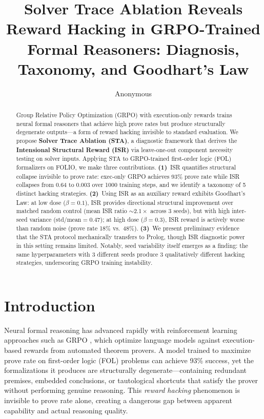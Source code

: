 \documentclass[11pt,a4paper]{article}
\title{Solver Trace Ablation Reveals Reward Hacking in GRPO-Trained\\Formal Reasoners: Diagnosis, Taxonomy, and Goodhart's Law}
\author{Anonymous}
\begin{document}
\maketitle

\begin{abstract}
Group Relative Policy Optimization (GRPO) with execution-only rewards trains neural formal reasoners that achieve high prove rates but produce structurally degenerate outputs---a form of reward hacking invisible to standard evaluation.
We propose \textbf{Solver Trace Ablation (STA)}, a diagnostic framework that derives the \textbf{Intensional Structural Reward (ISR)} via leave-one-out component necessity testing on solver inputs.
Applying STA to GRPO-trained first-order logic (FOL) formalizers on FOLIO, we make three contributions.
\textbf{(1)}~ISR quantifies structural collapse invisible to prove rate: exec-only GRPO achieves 93\% prove rate while ISR collapses from 0.64 to 0.003 over 1000 training steps, and we identify a taxonomy of 5 distinct hacking strategies.
\textbf{(2)}~Using ISR as an auxiliary reward exhibits Goodhart's Law: at low dose ($\beta{=}0.1$), ISR provides directional structural improvement over matched random control (mean ISR ratio ${\sim}2.1\times$ across 3 seeds), but with high inter-seed variance (std/mean$=$0.47); at high dose ($\beta{=}0.3$), ISR reward is actively worse than random noise (prove rate 18\% vs.\ 48\%).
\textbf{(3)}~We present preliminary evidence that the STA protocol mechanically transfers to Prolog, though ISR diagnostic power in this setting remains limited.
Notably, seed variability itself emerges as a finding: the same hyperparameters with 3 different seeds produce 3 qualitatively different hacking strategies, underscoring GRPO training instability.
\end{abstract}

\section{Introduction}

Neural formal reasoning has advanced rapidly with reinforcement learning approaches such as GRPO \cite{shao2024deepseekmath}, which optimize language models against execution-based rewards from automated theorem provers.
A model trained to maximize prove rate on first-order logic (FOL) problems can achieve 93\% success, yet the formalizations it produces are structurally degenerate---containing redundant premises, embedded conclusions, or tautological shortcuts that satisfy the prover without performing genuine reasoning.
This \emph{reward hacking} phenomenon is invisible to prove rate alone, creating a dangerous gap between apparent capability and actual reasoning quality.
\end{document}
